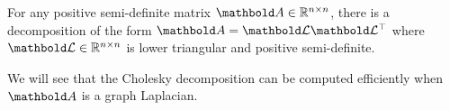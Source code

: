 \begin{lem} For any positive semi-definite matrix $\mA \in \R^{n \times n}$, there is a decomposition of the form $\mA = \mCalL\trans{\mCalL}$ where $\mCalL \in \R^{n \times n}$ is lower triangular and positive semi-definite.
\end{lem}

We will see that the Cholesky decomposition can be computed efficiently when $\mA$ is a graph Laplacian.